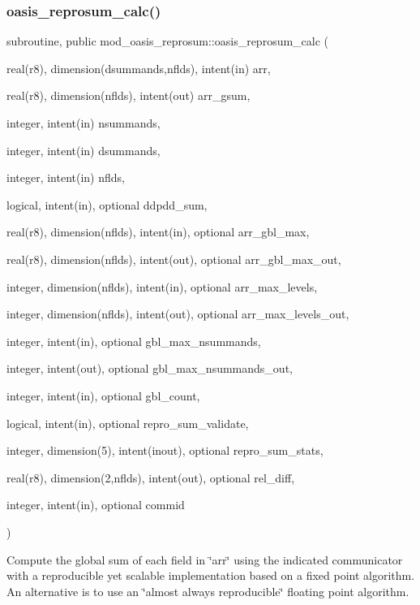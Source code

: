 \subsubsection{\texorpdfstring{oasis\+\_\+reprosum\+\_\+calc()}{oasis\_reprosum\_calc()}}
{\footnotesize\ttfamily subroutine, public mod\+\_\+oasis\+\_\+reprosum\+::oasis\+\_\+reprosum\+\_\+calc (\begin{DoxyParamCaption}\item[{real(r8), dimension(dsummands,nflds), intent(in)}]{arr,  }\item[{real(r8), dimension(nflds), intent(out)}]{arr\+\_\+gsum,  }\item[{integer, intent(in)}]{nsummands,  }\item[{integer, intent(in)}]{dsummands,  }\item[{integer, intent(in)}]{nflds,  }\item[{logical, intent(in), optional}]{ddpdd\+\_\+sum,  }\item[{real(r8), dimension(nflds), intent(in), optional}]{arr\+\_\+gbl\+\_\+max,  }\item[{real(r8), dimension(nflds), intent(out), optional}]{arr\+\_\+gbl\+\_\+max\+\_\+out,  }\item[{integer, dimension(nflds), intent(in), optional}]{arr\+\_\+max\+\_\+levels,  }\item[{integer, dimension(nflds), intent(out), optional}]{arr\+\_\+max\+\_\+levels\+\_\+out,  }\item[{integer, intent(in), optional}]{gbl\+\_\+max\+\_\+nsummands,  }\item[{integer, intent(out), optional}]{gbl\+\_\+max\+\_\+nsummands\+\_\+out,  }\item[{integer, intent(in), optional}]{gbl\+\_\+count,  }\item[{logical, intent(in), optional}]{repro\+\_\+sum\+\_\+validate,  }\item[{integer, dimension(5), intent(inout), optional}]{repro\+\_\+sum\+\_\+stats,  }\item[{real(r8), dimension(2,nflds), intent(out), optional}]{rel\+\_\+diff,  }\item[{integer, intent(in), optional}]{commid }\end{DoxyParamCaption})}



Compute the global sum of each field in \char`\"{}arr\char`\"{} using the indicated communicator with a reproducible yet scalable implementation based on a fixed point algorithm. An alternative is to use an \char`\"{}almost
 always reproducible\char`\"{} floating point algorithm. 


